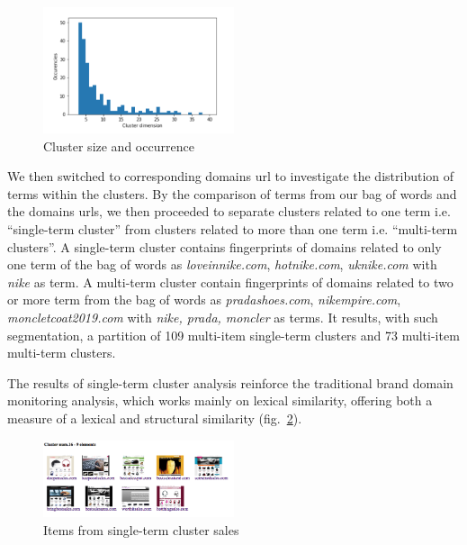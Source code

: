 \documentclass{easychair}
\begin{document}
\begin{figure}[ht]
  \begin{centering}
  \includegraphics[width=0.5\textwidth]{4.png}
  \caption{Cluster size and occurrence}
  \label{fig:4}
  \end{centering}
\end{figure}

We then switched to corresponding domains url to investigate the distribution of terms within the clusters. By the comparison of terms from our bag of words and the domains urls, we then proceeded to separate clusters related to one term i.e. “single-term cluster” from clusters related to more than one term i.e. “multi-term clusters”. A single-term cluster contains fingerprints of domains related to only one term of the bag of words as \textit{loveinnike.com}, \textit{hotnike.com}, \textit{uknike.com}  with \textit{nike} as term. A multi-term cluster contain fingerprints of domains related to two or more term from the bag of words as \textit{pradashoes.com}, \textit{nikempire.com}, \textit{moncletcoat2019.com} with \textit{nike, prada, moncler} as terms. It results, with such segmentation, a partition of 109 multi-item single-term clusters and 73 multi-item multi-term clusters. 

The results of single-term cluster analysis reinforce the traditional brand domain monitoring analysis, which works mainly on lexical similarity, offering both a measure of a lexical and structural similarity (fig.~\ref{fig:5}).

\begin{figure}[ht]
  \begin{centering}
  \includegraphics[width=0.5\textwidth]{5.png}
  \caption{Items from single-term cluster sales}
  \label{fig:5}
  \end{centering}
\end{figure}
\end{document}
